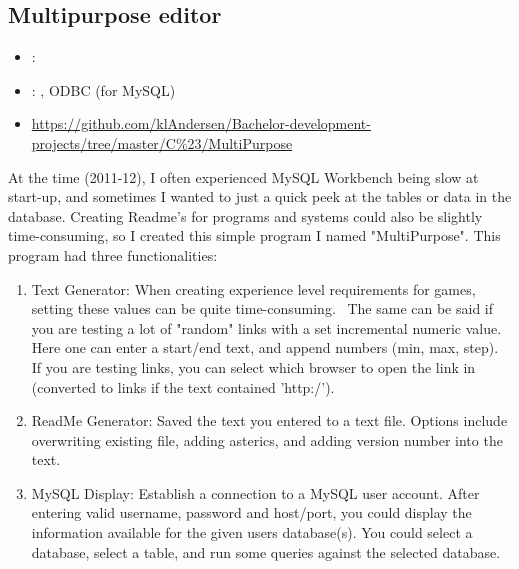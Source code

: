 \subsection{Multipurpose editor}
\label{sec:multipurpose}
\begin{itemize} 
	\item {}: 
	\item {}: , ODBC (for MySQL)
	\item {} \url{https://github.com/klAndersen/Bachelor-development-projects/tree/master/C%23/MultiPurpose}
\end{itemize} 
At the time (2011-12), I often experienced MySQL Workbench being slow at start-up, and sometimes I wanted to just a quick peek at the tables or data in the database. 
Creating Readme's for programs and systems could also be slightly time-consuming, so I created this simple program I named "MultiPurpose". 
This program had three functionalities:
\begin{enumerate}
	\item Text Generator: When creating experience level requirements for games, setting these values can be quite time-consuming. 
	The same can be said if you are testing a lot of "random" links with a set incremental numeric value. 
	Here one can enter a start/end text, and append numbers (min, max, step). 
	If you are testing links, you can select which browser to open the link in (converted to links if the text contained 'http:/').
	\item ReadMe Generator: Saved the text you entered to a text file. 
	Options include overwriting existing file, adding asterics, and adding version number into the text.
	\item MySQL Display: Establish a connection to a MySQL user account. 
	After entering valid username, password and host/port, you could display the information available for the given users database(s).
	You could select a database, select a table, and run some queries against the selected database.
\end{enumerate}
